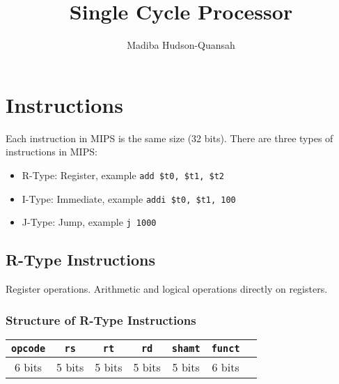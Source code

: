 \documentclass[12pt letter]{report}
\title{\Huge{Single Cycle Processor}}
\author{\huge{Madiba Hudson-Quansah}}
\date{}
\begin{document}
\maketitle
\newpage
{}
\tableofcontents
\pagebreak

\chapter{Instructions}

Each instruction in MIPS is the same size (32 bits). There are three types of instructions in MIPS:
\begin{itemize}
  \item R-Type: Register, example \texttt{add \$t0, \$t1, \$t2}
  \item I-Type: Immediate, example \texttt{addi \$t0, \$t1, 100}
  \item J-Type: Jump, example \texttt{j 1000}
\end{itemize}

\section{R-Type Instructions}

Register operations. Arithmetic and logical operations directly on registers.

\subsection{Structure of R-Type Instructions}

\begin{table}[h!]
  \begin{center}
    \begin{tabular}{|c|c|c|c|c|c|c|}
      \hline
      \texttt{opcode} & \texttt{rs} & \texttt{rt} & \texttt{rd} & \texttt{shamt} & \texttt{funct} \\
      \hline
      6 bits          & 5 bits      & 5 bits      & 5 bits      & 5 bits         & 6 bits         \\
      \hline
    \end{tabular}
  \end{center}
\end{table}
\end{document}
